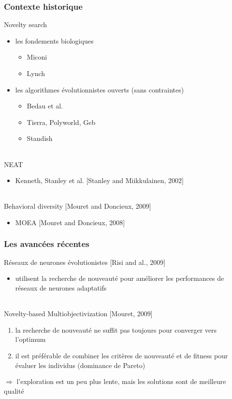\documentclass{beamer}
\begin{document}
\begin{frame}
\frametitle{Contexte historique}
Novelty search
\begin{itemize}
    \item les fondements biologiques%
    \begin{itemize}
        \item Miconi
        \item Lynch
    \end{itemize}
    \item les algorithmes évolutionnistes ouverts (sans contraintes) %
    \begin{itemize}
        \item Bedau et al.
        \item Tierra, Polyworld, Geb
        \item Standish
    \end{itemize}
\end{itemize}
~\\
NEAT%
\begin{itemize}
    \item Kenneth, Stanley et al. $[$Stanley and Miikkulainen, 2002$]$
\end{itemize}
~\\
Behavioral diversity [Mouret and Doncieux, 2009]
\begin{itemize}
    \item MOEA [Mouret and Doncieux, 2008]
\end{itemize}
\end{frame}


\begin{frame}
\frametitle{Les avancées récentes}
Réseaux de neurones évolutionistes [Risi and al., 2009]
\begin{itemize}
    \item utilisent la recherche de nouveauté pour améliorer les performances de réseaux de neurones adaptatifs
\end{itemize}
~\\
Novelty-based Multiobjectivization [Mouret, 2009]
\begin{enumerate}
     \item la recherche de nouveauté ne suffit pas toujours pour converger vers l'optimum
     \item il est préférable de combiner les critères de nouveauté et de fitness pour évaluer les individus (dominance de Pareto)%
\end{enumerate}
\bigskip
 $\Rightarrow$ l'exploration est un peu plus lente, mais les solutions sont de meilleure qualité
\end{frame}
\end{document}
